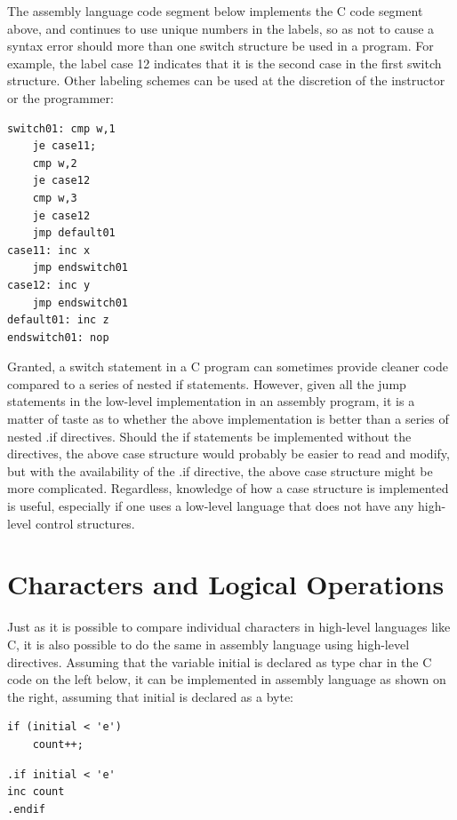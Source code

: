 \documentclass[10pt]{book}
\begin{document}
The assembly language code segment below implements the C code segment above, and continues to use unique numbers in the labels, so as not to cause a syntax error should more than one switch structure be used in a program. For\\
example, the label case 12 indicates that it is the second case in the first switch structure. Other labeling schemes can be used at the discretion of the instructor or the programmer:


\begin{verbatim}
switch01: cmp w,1
    je case11;
    cmp w,2
    je case12
    cmp w,3
    je case12
    jmp default01
case11: inc x
    jmp endswitch01
case12: inc y
    jmp endswitch01
default01: inc z
endswitch01: nop
\end{verbatim}

Granted, a switch statement in a C program can sometimes provide cleaner code compared to a series of nested if statements. However, given all the jump statements in the low-level implementation in an assembly program, it is a matter of taste as to whether the above implementation is better than a series of nested .if directives. Should the if statements be implemented without the directives, the above case structure would probably be easier to read and modify, but with the availability of the .if directive, the above case structure might be more complicated. Regardless, knowledge of how a case structure is implemented is useful, especially if one uses a low-level language that does not have any high-level control structures.

\section{Characters and Logical Operations}
Just as it is possible to compare individual characters in high-level languages like C, it is also possible to do the same in assembly language using high-level directives. Assuming that the variable initial is declared as type char in the C code on the left below, it can be implemented in assembly language as shown on the right, assuming that initial is declared as a byte:

\begin{verbatim}
if (initial < 'e')
    count++;
\end{verbatim}

\begin{verbatim}
.if initial < 'e'
inc count
.endif
\end{verbatim}
\end{document}
